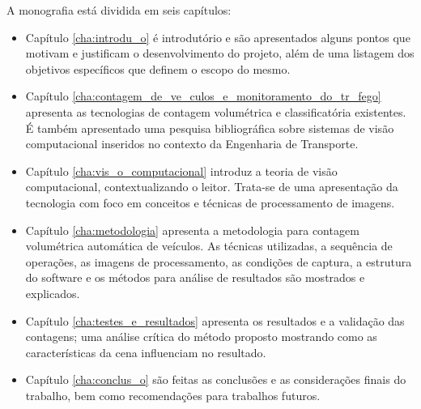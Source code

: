 A monografia está dividida em seis capítulos:

\begin{itemize}
  \item Capítulo \ref{cha:introdu_o} é introdutório e são apresentados alguns pontos que motivam e justificam o desenvolvimento do projeto, além de uma listagem dos objetivos específicos que definem o escopo do mesmo.
  \item Capítulo \ref{cha:contagem_de_ve_culos_e_monitoramento_do_tr_fego} apresenta as tecnologias de contagem volumétrica e classificatória existentes. É também apresentado uma pesquisa bibliográfica sobre sistemas de visão computacional inseridos no contexto da Engenharia de Transporte.
  \item Capítulo \ref{cha:vis_o_computacional} introduz a teoria de visão computacional, contextualizando o leitor. Trata-se de uma apresentação da tecnologia com foco em conceitos e técnicas de processamento de imagens.
  \item Capítulo \ref{cha:metodologia} apresenta a metodologia para contagem volumétrica automática de veículos. As técnicas utilizadas, a sequência de operações, as imagens de processamento, as condições de captura, a estrutura do software e os métodos para análise de resultados são mostrados e explicados. 
  \item Capítulo \ref{cha:testes_e_resultados} apresenta os resultados e a validação das contagens; uma análise crítica do método proposto mostrando como as características da cena influenciam no resultado. 
  \item Capítulo \ref{cha:conclus_o} são feitas as conclusões e as considerações finais do trabalho, bem como recomendações para trabalhos futuros.
\end{itemize}


